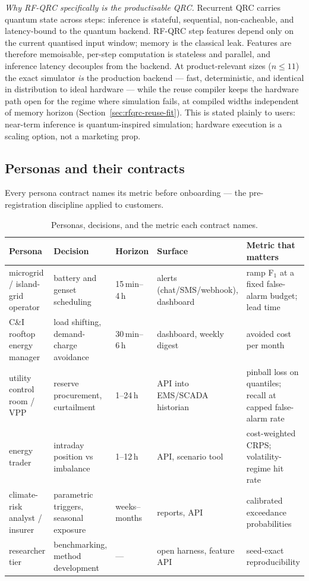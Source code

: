 \emph{Why RF-QRC specifically is the productisable QRC.} Recurrent QRC
carries quantum state across steps: inference is stateful, sequential,
non-cacheable, and latency-bound to the quantum backend. RF-QRC step
features depend only on the current quantised input window; memory is the
classical leak. Features are therefore memoisable, per-step computation is
stateless and parallel, and inference latency decouples from the backend.
At product-relevant sizes ($n\le11$) the exact simulator \emph{is} the
production backend --- fast, deterministic, and identical in distribution
to ideal hardware --- while the reuse compiler keeps the hardware path open
for the regime where simulation fails, at compiled widths independent of
memory horizon (Section~\ref{sec:rfqrc-reuse-fit}). This is stated plainly
to users: near-term inference is quantum-inspired simulation; hardware
execution is a scaling option, not a marketing prop.

\subsection{Personas and their contracts}
\label{sec:prod-personas}

Every persona contract names its metric before onboarding --- the
pre-registration discipline applied to customers.

\begin{table}[h]
\centering\footnotesize
\caption{Personas, decisions, and the metric each contract names.}
\label{tab:prod-personas}
\begin{tabular}{@{}p{2.9cm}p{3.1cm}p{1.7cm}p{2.6cm}p{3.4cm}@{}}
\toprule
Persona & Decision & Horizon & Surface & Metric that matters \\
\midrule
microgrid / island-grid operator & battery and genset scheduling & 15\,min--4\,h & alerts (chat/SMS/webhook), dashboard & ramp F$_1$ at a fixed false-alarm budget; lead time \\
C\&I rooftop energy manager & load shifting, demand-charge avoidance & 30\,min--6\,h & dashboard, weekly digest & avoided cost per month \\
utility control room / VPP & reserve procurement, curtailment & 1--24\,h & API into EMS/SCADA historian & pinball loss on quantiles; recall at capped false-alarm rate \\
energy trader & intraday position vs imbalance & 1--12\,h & API, scenario tool & cost-weighted CRPS; volatility-regime hit rate \\
climate-risk analyst / insurer & parametric triggers, seasonal exposure & weeks--months & reports, API & calibrated exceedance probabilities \\
researcher tier & benchmarking, method development & --- & open harness, feature API & seed-exact reproducibility \\
\bottomrule
\end{tabular}
\end{table}

